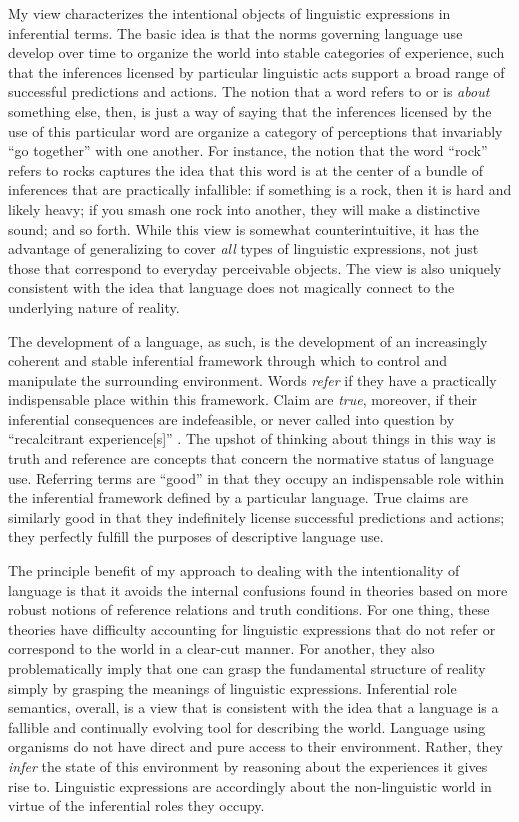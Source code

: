 My view characterizes the intentional objects of linguistic expressions in inferential terms. The basic idea is that the norms governing language use develop over time to organize the world into stable categories of experience, such that the inferences licensed by particular linguistic acts support a broad range of successful predictions and actions. The notion that a word refers to or is \textit{about} something else, then, is just a way of saying that the inferences licensed by the use of this particular word are organize a category of perceptions that invariably ``go together'' with one another. For instance, the notion that the word ``rock'' refers to rocks captures the idea that this word is at the center of a bundle of inferences that are practically infallible: if something is a rock, then it is hard and likely heavy; if you smash one rock into another, they will make a distinctive sound; and so forth. While this view is somewhat counterintuitive, it has the advantage of generalizing to cover \textit{all} types of linguistic expressions, not just those that correspond to everyday perceivable objects. The view is also uniquely consistent with the idea that language does not magically connect to the underlying nature of reality.

The development of a language, as such, is the development of an increasingly coherent and stable inferential framework through which to control and manipulate the surrounding environment. Words \textit{refer} if they have a practically indispensable place within this framework. Claim are \textit{true}, moreover, if their inferential consequences are indefeasible, or never called into question by ``recalcitrant experience[s]'' \citep[][p. 33]{Misak:2013}. The upshot of thinking about things in this way is truth and reference are concepts that concern the normative status of language use. Referring terms are ``good'' in that they occupy an indispensable role within the inferential framework defined by a particular language. True claims are similarly good in that they indefinitely license successful predictions and actions; they perfectly fulfill the purposes of descriptive language use. 

The principle benefit of my approach to dealing with the intentionality of language is that it avoids the internal confusions found in theories based on more robust notions of reference relations and truth conditions. For one thing, these theories have difficulty accounting for linguistic expressions that do not refer or correspond to the world in a clear-cut manner. For another, they also problematically imply that one can grasp the fundamental structure of reality simply by grasping the meanings of linguistic expressions. Inferential role semantics, overall, is a view that is consistent with the idea that a language is a fallible and continually evolving tool for describing the world. Language using organisms do not have direct and pure access to their environment. Rather, they \textit{infer} the state of this environment by reasoning about the experiences it gives rise to. Linguistic expressions are accordingly about the non-linguistic world in virtue of the inferential roles they occupy. 

